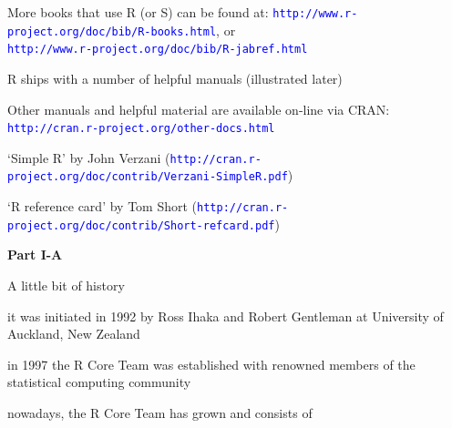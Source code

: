 \documentclass{presentatiesmetlogo}
\newcommand{\code}[1]{\textcolor{blue}{\texttt{#1}}}
\newcommand{\blue}[1]{\textcolor{blue}{#1}}
\newcommand{\R}{{\textsf{R} }}
\let \nl = \newline
\begin{document}
\bitem
\item More books that use \R (or S) can be found at:
\code{http://www.r-project.org/doc/bib/R-books.html}, or\\
    \code{http://www.r-project.org/doc/bib/R-jabref.html}
\eitem
\bitem
\item \R ships with a number of helpful manuals (illustrated later)
\nl
\item Other manuals and helpful material are available on-line
via CRAN:\\\code{http://cran.r-project.org/other-docs.html}
\bitemt
\item `Simple R' by John Verzani
(\code{http://cran.r-project.org/doc/contrib/Verzani-SimpleR.pdf})
\item `R reference card' by Tom Short
(\code{http://cran.r-project.org/doc/contrib/Short-refcard.pdf})
\eitemt
\eitem
\newpage
\mbox{ }
\vspace{5cm}
\begin{center}
{\Huge \textbf{Part I-A}}
\end{center}
\bitem
\item A little bit of history
\bitemt
\item it was initiated in 1992 by Ross Ihaka and Robert
Gentleman at University of Auckland, New Zealand
\item in 1997 the R Core Team was established with renowned
members of the statistical computing community
\item nowadays, the R Core Team has grown and consists of
\end{document}

